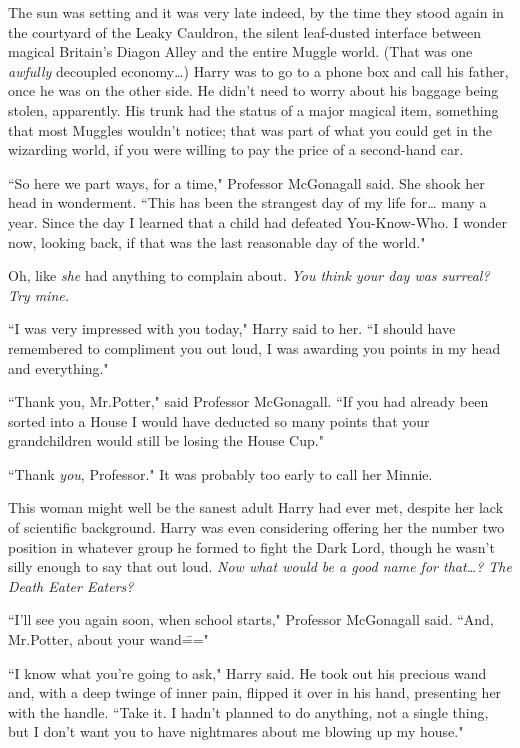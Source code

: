 \later

The sun was setting and it was very late indeed, by the time they stood again in the courtyard of the Leaky Cauldron, the silent leaf-dusted interface between magical Britain's Diagon Alley and the entire Muggle world. (That was one \emph{awfully} decoupled economy{\ldots}) Harry was to go to a phone box and call his father, once he was on the other side. He didn't need to worry about his baggage being stolen, apparently. His trunk had the status of a major magical item, something that most Muggles wouldn't notice; that was part of what you could get in the wizarding world, if you were willing to pay the price of a second-hand car.

``So here we part ways, for a time," Professor McGonagall said. She shook her head in wonderment. ``This has been the strangest day of my life for{\ldots} many a year. Since the day I learned that a child had defeated You-Know-Who. I wonder now, looking back, if that was the last reasonable day of the world."

Oh, like \emph{she} had anything to complain about. \emph{You think your day was surreal? Try mine.}

``I was very impressed with you today," Harry said to her. ``I should have remembered to compliment you out loud, I was awarding you points in my head and everything."

``Thank you, Mr.\?Potter," said Professor McGonagall. ``If you had already been sorted into a House I would have deducted so many points that your grandchildren would still be losing the House Cup."

``Thank \emph{you}, Professor." It was probably too early to call her Minnie.

This woman might well be the sanest adult Harry had ever met, despite her lack of scientific background. Harry was even considering offering her the number two position in whatever group he formed to fight the Dark Lord, though he wasn't silly enough to say that out loud. \emph{Now what would be a good name for that{\ldots}? The Death Eater Eaters?}

``I'll see you again soon, when school starts," Professor McGonagall said. ``And, Mr.\?Potter, about your wand\==="

``I know what you're going to ask," Harry said. He took out his precious wand and, with a deep twinge of inner pain, flipped it over in his hand, presenting her with the handle. ``Take it. I hadn't planned to do anything, not a single thing, but I don't want you to have nightmares about me blowing up my house."


